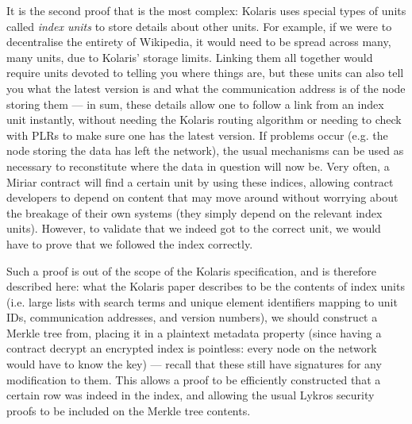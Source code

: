 \documentclass{extreport}
\begin{document}
It is the second proof that is the most complex: Kolaris uses special types of units called \emph{index units} to store details about other units. For example, if we were to decentralise the entirety of Wikipedia, it would need to be spread across many, many units, due to Kolaris' storage limits. Linking them all together would require units devoted to telling you where things are, but these units can also tell you what the latest version is and what the communication address is of the node storing them --- in sum, these details allow one to follow a link from an index unit instantly, without needing the Kolaris routing algorithm or needing to check with PLRs to make sure one has the latest version. If problems occur (e.g. the node storing the data has left the network), the usual mechanisms can be used as necessary to reconstitute where the data in question will now be. Very often, a Miriar contract will find a certain unit by using these indices, allowing contract developers to depend on content that may move around without worrying about the breakage of their own systems (they simply depend on the relevant index units). However, to validate that we indeed got to the correct unit, we would have to prove that we followed the index correctly.

Such a proof is out of the scope of the Kolaris specification, and is therefore described here: what the Kolaris paper describes to be the contents of index units (i.e. large lists with search terms and unique element identifiers mapping to unit IDs, communication addresses, and version numbers), we should construct a Merkle tree from, placing it in a plaintext metadata property (since having a contract decrypt an encrypted index is pointless: every node on the network would have to know the key) --- recall that these still have signatures for any modification to them. This allows a proof to be efficiently constructed that a certain row was indeed in the index, and allowing the usual Lykros security proofs to be included on the Merkle tree contents.
\end{document}
